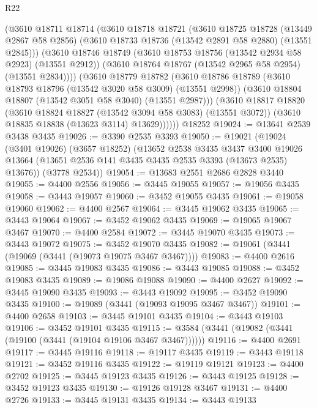 \begin{lexlean}{R22}
\begin{coremodule}
        (@3610
          @18711
          @18714
          (@3610
            @18718
            @18721
            (@3610
              @18725
              @18728
              (@13449 @2867 @58 @2856)
              (@3610 @18733 @18736 (@13542 @2891 @58 @2880) (@13551 @2845)))
            (@3610
              @18746
              @18749
              (@3610 @18753 @18756 (@13542 @2934 @58 @2923) (@13551 @2912))
              (@3610 @18764 @18767 (@13542 @2965 @58 @2954) (@13551 @2834))))
          (@3610
            @18779
            @18782
            (@3610
              @18786
              @18789
              (@3610 @18793 @18796 (@13542 @3020 @58 @3009) (@13551 @2998))
              (@3610 @18804 @18807 (@13542 @3051 @58 @3040) (@13551 @2987)))
            (@3610
              @18817
              @18820
              (@3610 @18824 @18827 (@13542 @3094 @58 @3083) (@13551 @3072))
              (@3610 @18835 @18838 (@13623 @3114) @13629))))))
    @18252
@19024 := @13641 @2539 @3438 @3435
@19026 := @3390 @2535 @3393
@19050 := @19021
    (@19024
      (@3401 @19026)
      (@3657 @18252)
      (@13652
        @2538
        @3435
        @3437
        @3400
        @19026
        @13664
        (@13651 @2536 @141 @3435 @3435 @2535 @3393 (@13673 @2535) @13676))
      (@3778 @2534))
@19054 := @13683 @2551 @2686 @2828 @3440
@19055 := @4400 @2556
@19056 := @3445 @19055
@19057 := @19056 @3435
@19058 := @3443 @19057
@19060 := @3452 @19055 @3435
@19061 := @19058 @19060
@19062 := @4400 @2567
@19064 := @3445 @19062 @3435
@19065 := @3443 @19064
@19067 := @3452 @19062 @3435
@19069 := @19065 @19067 @3467
@19070 := @4400 @2584
@19072 := @3445 @19070 @3435
@19073 := @3443 @19072
@19075 := @3452 @19070 @3435
@19082 := @19061 (@3441 (@19069 (@3441 (@19073 @19075 @3467 @3467))))
@19083 := @4400 @2616
@19085 := @3445 @19083 @3435
@19086 := @3443 @19085
@19088 := @3452 @19083 @3435
@19089 := @19086 @19088
@19090 := @4400 @2627
@19092 := @3445 @19090 @3435
@19093 := @3443 @19092
@19095 := @3452 @19090 @3435
@19100 := @19089 (@3441 (@19093 @19095 @3467 @3467))
@19101 := @4400 @2658
@19103 := @3445 @19101 @3435
@19104 := @3443 @19103
@19106 := @3452 @19101 @3435
@19115 := @3584 (@3441 (@19082 (@3441 (@19100 (@3441 (@19104 @19106 @3467 @3467))))))
@19116 := @4400 @2691
@19117 := @3445 @19116
@19118 := @19117 @3435
@19119 := @3443 @19118
@19121 := @3452 @19116 @3435
@19122 := @19119 @19121
@19123 := @4400 @2702
@19125 := @3445 @19123 @3435
@19126 := @3443 @19125
@19128 := @3452 @19123 @3435
@19130 := @19126 @19128 @3467
@19131 := @4400 @2726
@19133 := @3445 @19131 @3435
@19134 := @3443 @19133

\end{coremodule}
\end{lexlean}
